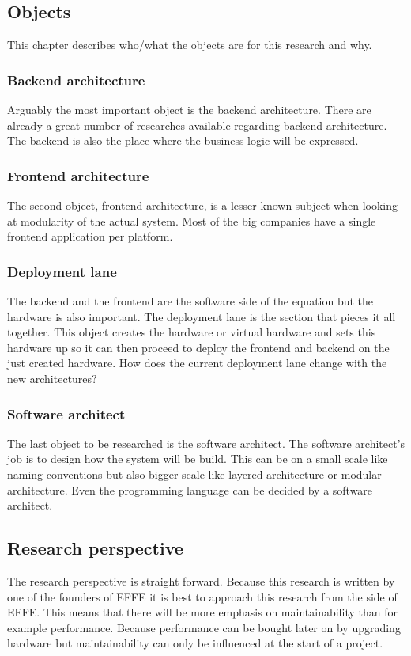 \subsection{Objects}
This chapter describes who/what the objects are for this research and why.

\subsubsection{Backend architecture}
Arguably the most important object is the backend architecture. There are already a great number of researches available regarding backend architecture. The backend is also the place where the business logic will be expressed.

\subsubsection{Frontend architecture}
The second object, frontend architecture, is a lesser known subject when looking at modularity of the actual system. Most of the big companies have a single frontend application per platform.

\subsubsection{Deployment lane}
\label{sec:DeploymentLane}
The backend and the frontend are the software side of the equation but the hardware is also important. The deployment lane is the section that pieces it all together. This object creates the hardware or virtual hardware and sets this hardware up so it can then proceed to deploy the frontend and backend on the just created hardware. How does the current deployment lane change with the new architectures?

\subsubsection{Software architect}
\label{sec:SoftwareArchitect}
The last object to be researched is the software architect. The software architect's job is to design how the system will be build. This can be on a small scale like naming conventions but also bigger scale like layered architecture or modular architecture. Even the programming language can be decided by a software architect.

\subsection{Research perspective}
The research perspective is straight forward. Because this research is written by one of the founders of EFFE it is best to approach this research from the side of EFFE. This means that there will be more emphasis on maintainability than for example performance. Because performance can be bought later on by upgrading hardware but maintainability can only be influenced at the start of a project.

